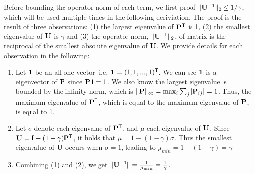 Before bounding the operator norm of each term, we first proof $\|\mathbf{{U}}^{-1}\|_2 \leq 1/\gamma$, which will be used multiple times in the following deriviation.
 The proof is the result of three observations: (1) the largest eigenvalue of $\mathbf{{P}}^{\mathsf{T}}$ is 1, (2) the smallest eigenvalue of $\mathbf{{U}}$ is $\gamma$ and (3) the operator norm, $\|\mathbf{{U}}^{-1}\|_2$, of matrix \invUmatrix is the reciprocal of the smallest absolute eigenvalue of $\mathbf{{U}}$. We provide details for each observation in the following:
\begin{enumerate}
	\item Let $\mathbf{{1}}_{}$ be an all-one vector, i.e. $\mathbf{{1}}_{} = (1,1,...,1)^{\mathsf{T}}$. We can see $\mathbf{{1}}_{}$ is a eigenvector of $\mathbf{{P}}$ since $\mathbf{{P}} \textbf{1} = 1$. We also know the largest eigenvalue is bounded by the infinity norm, which is $\| \mathbf{{P}}\|_{\infty} = \max_i \sum_{j}|\mathbf{{P}}_{ij}| = 1$. Thus, the maximum eigenvalue of $\mathbf{{P}}^{\mathsf{T}}$, which is equal to the maximum eigenvalue of $\mathbf{{P}}$, is equal to 1.
	
	\item Let $\sigma$ denote each eigenvalue of $\mathbf{{P}}^{\mathsf{T}}$, and $\mu$ each eigenvalue of $\mathbf{{U}}$. Since $\mathbf{{U}} = \mathbf{{I}} - (1 - \gamma) \mathbf{{P}}^{\mathsf{T}}$, it holds that $\mu = 1 - (1 - \gamma) \sigma$. Thus the smallest eigenvalue of $\mathbf{{U}}$ occurs when $\sigma = 1$, leading to $\mu_{min} = 1 - (1 - \gamma) = \gamma$
	
	\item Combining (1) and (2), we get $\| \mathbf{{U}}^{-1}\| = \frac{1}{\mu_{min}} = \frac{1}{\gamma}$. 
\end{enumerate}

